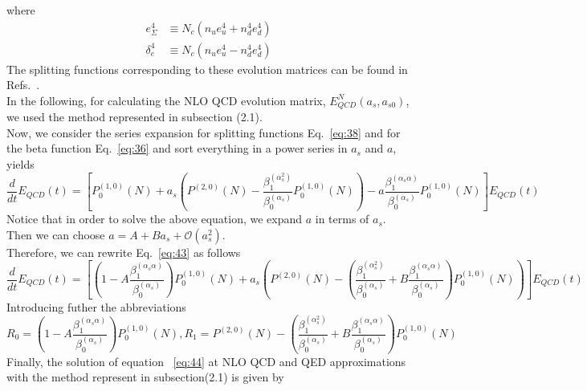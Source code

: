 \documentclass[review]{elsarticle}
\begin{document}
where
\begin{align*}
e_{\varSigma}^{4} & \equiv N_{c}(n_{u}e_{u}^{4}+n_{d}^{4}e_{d}^{4})\\
\delta_{e}^{4} & \equiv N_{c}(n_{u}e_{u}^{4}-n_{d}^{4}e_{d}^{4})
\end{align*}
The splitting functions corresponding to these evolution matrices can be found in Refs.~\cite{deFlorian:2015ujt,deFlorian:2016gvk}.
\\
In the following, for calculating the NLO QCD evolution matrix, $E_{QCD}^{N}(a_{s},a_{s0})$, we used the method represented in subsection (2.1).
\\
Now, we consider the series expansion for splitting functions Eq.~\eqref{eq:38} and for the beta function Eq.~\eqref{eq:36} and sort everything in a power series in $a_{s}$ and $a$, yields
\begin{equation}
\frac{d}{dt}E_{QCD}(t)=\left[P_{0}^{(1,0)}(N)+a_{s}(P^{(2,0)}(N)-\frac{\beta_{1}^{(\alpha_s^2)}}{\beta_0^{(\alpha_s)}}P_{0}^{(1,0)}(N))-a\frac{\beta_{1}^{(\alpha_s \alpha)}}{\beta_0^{(\alpha_s)}}P_{0}^{(1,0)}(N)\right]E_{QCD}(t)\label{eq:43}
\end{equation} 
Notice that in order to solve the above equation, we expand $a$ in terms of $a_s$. Then we can choose $a=A+B a_s+\mathcal{O}(a_s^2)$.
\\
Therefore, we can rewrite Eq.~\eqref{eq:43} as follows
\begin{equation}
\frac{d}{dt}E_{QCD}(t)=\left[(1- A\frac{\beta_{1}^{(\alpha_s \alpha)}}{\beta_0^{(\alpha_s)}} )P_{0}^{(1,0)}(N)+a_{s}(P^{(2,0)}(N)-(\frac{\beta_{1}^{(\alpha_s^2)}}{\beta_0^{(\alpha_s)}}+B\frac{\beta_{1}^{(\alpha_s \alpha)}}{\beta_0^{(\alpha_s)}})P_{0}^{(1,0)}(N))\right]E_{QCD}(t)\label{eq:44}
\end{equation} 
Introducing futher the abbreviations
\begin{equation}
R_0=(1- A\frac{\beta_{1}^{(\alpha_s \alpha)}}{\beta_0^{(\alpha_s)}} )P_{0}^{(1,0)}(N), R_1=P^{(2,0)}(N)-(\frac{\beta_{1}^{(\alpha_s^2)}}{\beta_0^{(\alpha_s)}}+B\frac{\beta_{1}^{(\alpha_s \alpha)}}{\beta_0^{(\alpha_s)}})P_{0}^{(1,0)}(N)
\end{equation} 
Finally, the solution of equation ~\eqref{eq:44} at NLO QCD and QED approximations with the method represent in subsection(2.1) is given by
\end{document}
